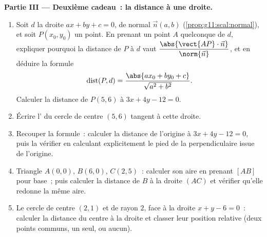 \begin{problem}
\medskip
\noindent\textbf{Partie III --- Deuxième cadeau~: la distance à une
droite.}
\begin{enumerate}[resume]
  \item Soit $d$ la droite $ax + by + c = 0$, de  normal
        $\vec n(a, b)$ (\cref{prop:g11:scal:normal}), et soit
        $P(x_0, y_0)$ un point. En prenant un point $A$ quelconque
        de $d$, expliquer pourquoi la distance de $P$ à $d$ vaut
        $\dfrac{\abs{\vect{AP} \cdot \vec n}}{\norm{\vec n}}$, et en
        déduire la formule
        \[
        \operatorname{dist}(P, d)
        = \frac{\abs{a x_0 + b y_0 + c}}{\sqrt{a^2 + b^2}} .
        \]
        Calculer la distance de $P(5, 6)$ à $3x + 4y - 12 = 0$.
  \item Écrire l' du cercle de centre $(5, 6)$ tangent à
        cette droite.
  \item Recouper la formule~: calculer la distance de l'origine à
        $3x + 4y - 12 = 0$, puis la vérifier en calculant
        explicitement le pied de la perpendiculaire issue de
        l'origine.
  \item Triangle $A(0,0)$, $B(6,0)$, $C(2,5)$~: calculer son aire en
        prenant $[AB]$ pour base~; puis calculer la distance de $B$
        à la droite $(AC)$ et vérifier qu'elle redonne la même aire.
  \item Le cercle de centre $(2, 1)$ et de rayon $2$, face à la
        droite $x + y - 6 = 0$~: calculer la distance du centre à la
        droite et classer leur position relative (deux points
        communs, un seul, ou aucun).
\end{enumerate}


\end{problem}
